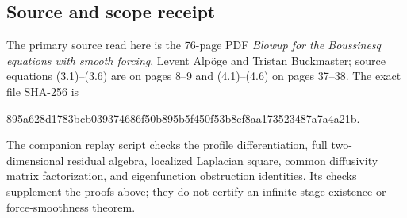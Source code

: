 \subsection*{Source and scope receipt}
The primary source read here is the 76-page PDF
\emph{Blowup for the Boussinesq equations with smooth forcing},
Levent Alp\"oge and Tristan Buckmaster; source equations (3.1)--(3.6)
are on pages 8--9 and (4.1)--(4.6) on pages 37--38.
The exact file SHA-256 is
\begin{center}\small\ttfamily
895a628d1783bcb039374686f50b895b5f450f53b8ef8aa173523487a7a4a21b.
\end{center}
The companion replay script checks the profile differentiation, full
two-dimensional residual algebra, localized Laplacian square, common
diffusivity matrix factorization, and eigenfunction obstruction
identities. Its checks supplement the proofs above; they do not certify
an infinite-stage existence or force-smoothness theorem.
